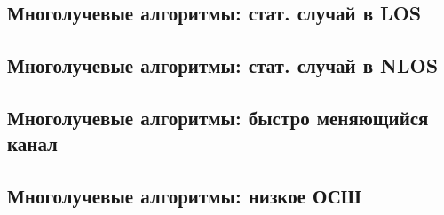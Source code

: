 \subsection{Многолучевые алгоритмы: стат. случай в LOS}
\subsection{Многолучевые алгоритмы: стат. случай в NLOS}
\subsection{Многолучевые алгоритмы: быстро меняющийся канал}
\subsection{Многолучевые алгоритмы: низкое ОСШ}